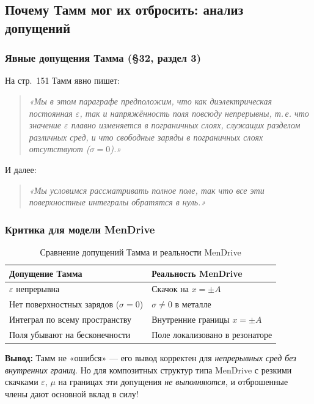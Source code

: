 \documentclass[a4paper,12pt]{article}
\begin{document}
\subsection{Почему Тамм мог их отбросить: анализ допущений}

\subsubsection{Явные допущения Тамма (§32, раздел 3)}

На стр.~151 Тамм явно пишет:

\begin{quote}
\textit{«Мы в этом параграфе предположим, что как диэлектрическая постоянная
$\varepsilon$, так и напряжённость поля повсюду непрерывны, т.\,е. что
значение $\varepsilon$ плавно изменяется в пограничных слоях, служащих
разделом различных сред, и что свободные заряды в пограничных слоях
отсутствуют ($\sigma = 0$).»}
\end{quote}

И далее:

\begin{quote}
\textit{«Мы условимся рассматривать \textit{полное поле}, так что все эти
поверхностные интегралы обратятся в нуль.»}
\end{quote}

\subsubsection{Критика для модели MenDrive}

\begin{table}[h]
\centering
\caption{Сравнение допущений Тамма и реальности MenDrive}
\label{tab:tamm_assumptions_vs_mendrive}
\begin{tabular}{@{}p{}@{}p{}@{}}
\toprule
\textbf{Допущение Тамма} & \textbf{Реальность MenDrive} \\
\midrule
$\varepsilon$ непрерывна & Скачок на $x = \pm A$ \\
Нет поверхностных зарядов ($\sigma = 0$) & $\sigma \neq 0$ в металле \\
Интеграл по всему пространству & Внутренние границы $x = \pm A$ \\
Поля убывают на бесконечности & Поле локализовано в резонаторе \\
\bottomrule
\end{tabular}
\end{table}

\textbf{Вывод:} Тамм не «ошибся» --- его вывод корректен для \textit{непрерывных
сред без внутренних границ}. Но для композитных структур типа MenDrive
с резкими скачками $\varepsilon$, $\mu$ на границах эти допущения
\textit{не выполняются}, и отброшенные члены дают основной вклад в силу!
\end{document}
